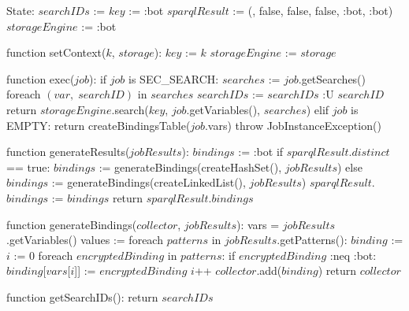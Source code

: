 State:
    $searchIDs$ := {}
    $key$ := :bot
    $sparqlResult$ := ({}, false, false, false, :bot, :bot)
    $storageEngine$ := :bot

function setContext($k$, $storage$):
    $key$ := $k$
    $storageEngine$ := $storage$

function exec($job$):
    if $job$ is SEC_SEARCH:
        $searches$ := $job$.getSearches()
        foreach $(var, \; searchID)$ in $searches$
            $searchIDs$ :=  $searchIDs$ :U { $searchID$ }
        return $storageEngine$.search($key$, $job$.getVariables(), $searches$)
    elif $job$ is EMPTY:
        return createBindingsTable($job$.vars)
    throw JobInstanceException()

function generateResults($jobResults$):
    $bindings$ := :bot
    if $sparqlResult$.$distinct$ == true:
        $bindings$ := generateBindings(createHashSet(), $jobResults$)
    else
        $bindings$ := generateBindings(createLinkedList(), $jobResults$)
    $sparqlResult$.$bindings$ := $bindings$
    return $sparqlResult$.$bindings$

function generateBindings($collector$, $jobResults$):
    vars = $jobResults$.getVariables()
    values := {}
    foreach $patterns$ in $jobResults$.getPatterns():
        $binding$ := {}
        $i$ := 0
        foreach $encryptedBinding$ in $patterns$:
            if $encryptedBinding$ :neq :bot:
                $binding$[$vars$[$i$]] := $encryptedBinding$
            $i$++
        $collector$.add($binding$)
    return $collector$

function getSearchIDs():
    return $searchIDs$